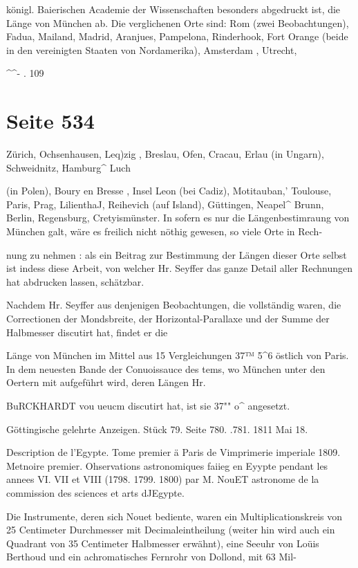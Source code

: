\documentclass[10pt,a4paper]{article}
\begin{document}
königl. Baierischen Academie der Wissenschaften besonders abgedruckt ist, die Länge von München ab. Die verglichenen Orte sind: Rom (zwei Beobachtungen), Fadua, Mailand, Madrid, Aranjues, Pampelona, Rinderhook, Fort Orange (beide in den vereinigten Staaten von Nordamerika), Amsterdam , Utrecht,

\textasciicircum{}\textasciicircum{}- . 109


\newpage
\section*{Seite 534}
Zürich, Ochsenhausen, Leq)zig , Breslau, Ofen, Cracau, Erlau (in Ungarn), Schweidnitz, Hamburg\textasciicircum{} Luch

(in Polen), Boury en Bresse , Insel Leon (bei Cadiz), Motitauban,' Toulouse, Paris, Prag, LilienthaJ, Reihevich (auf Island), Güttingen, Neapel\textasciicircum{} Brunn, Berlin, Regensburg, Cretyismünster. In sofern es nur die Längenbestimraung von München galt, wäre es freilich nicht nöthig gewesen, so viele Orte in Rech-

nung zu nehmen : als ein Beitrag zur Bestimmung der Längen dieser Orte selbst ist indess diese Arbeit, von welcher Hr. Seyffer das ganze Detail aller Rechnungen hat abdrucken lassen, schätzbar.

Nachdem Hr. Seyffer aus denjenigen Beobachtungen, die vollständig waren, die Correctionen der Mondsbreite, der Horizontal-Parallaxe und der Summe der Halbmesser discutirt hat, findet er die

Länge von München im Mittel aus 15 Vergleichungen 37™ 5\textasciicircum{}6 östlich von Paris. In dem neuesten Bande der Conuoissauce des tems, wo München unter den Oertern mit aufgeführt wird, deren Längen Hr.

BuRCKHARDT vou ueucm discutirt hat, ist sie 37"" o\textasciicircum{} angesetzt.

Göttingische gelehrte Anzeigen. Stück 79. Seite 780. .781. 1811 Mai 18.

Description de l'Egypte. Tome premier ä Paris de Vimprimerie imperiale 1809. Metnoire premier. Ohservations astronomiques faiieg en Eyypte pendant les annees VI. VII et VIII (1798. 1799. 1800) par M. NouET astronome de la commission des sciences et arts dJEgypte.

Die Instrumente, deren sich Nouet bediente, waren ein Multiplicationskreis von 25 Centimeter Durchmesser mit Decimaleintheilung (weiter hin wird auch ein Quadrant von 35 Centimeter Halbmesser erwähnt), eine Seeuhr von Loüis Berthoud und ein achromatisches Fernrohr von Dollond, mit 63 Mil-
\end{document}
